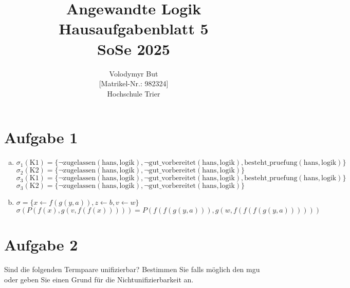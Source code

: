 \documentclass[10pt, oneside]{article}
\title{Angewandte Logik\\[15pt]\Large{Hausaufgabenblatt 5}\\[10pt]\Large{SoSe 2025}}
\author{Volodymyr But\\[5pt][Matrikel-Nr.: 982324]\\[10pt]Hochschule Trier}
\date{}
\begin{document}
\maketitle
\vspace{25px}

\section{Aufgabe 1}

\begin{enumerate}[(a)]
    \item
        $\sigma_1(\text{K}1) = \{\lnot\text{zugelassen}(\text{hans}, \text{logik}), \lnot\text{gut\_vorbereitet}(\text{hans}, \text{logik}), \text{besteht\_pruefung}(\text{hans}, \text{logik})\}$ \\[5pt]
        $\sigma_2(\text{K}2) = \{\lnot\text{zugelassen}(\text{hans}, \text{logik}), \lnot\text{gut\_vorbereitet}(\text{hans}, \text{logik})\}$ \\[5pt]
        $\sigma_3(\text{K}1) = \{\lnot\text{zugelassen}(\text{hans}, \text{logik}), \lnot\text{gut\_vorbereitet}(\text{hans}, \text{logik}), \text{besteht\_pruefung}(\text{hans}, \text{logik})\}$ \\[5pt]
        $\sigma_3(\text{K}2) = \{\lnot\text{zugelassen}(\text{hans}, \text{logik}), \lnot\text{gut\_vorbereitet}(\text{hans}, \text{logik})\}$ \\[5pt]

    \item
        $\sigma = \{x \leftarrow f(g(y, a)), z \leftarrow b, v \leftarrow w\}$ \\[5pt]
        $\sigma(P(f(x), g(v, f(f(x))))) = P(f(f(g(y, a))), g(w, f(f(f(g(y, a))))))$
\end{enumerate}

\section{Aufgabe 2}

Sind die folgenden Termpaare unifizierbar? Bestimmen Sie falls möglich den
mgu oder geben Sie einen Grund für die Nichtunifizierbarkeit an.
\end{document}
